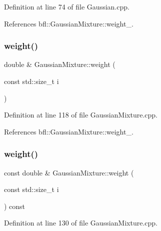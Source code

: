 Definition at line 74 of file Gaussian.\+cpp.



References bfl\+::\+Gaussian\+Mixture\+::weight\+\_\+.

\mbox{\label{classbfl_1_1GaussianMixture_a44885fb208e33f37015d47f55d02ef50}} 
\subsubsection{\texorpdfstring{weight()}{weight()}\hspace{0.1cm}{\footnotesize\ttfamily [3/4]}}
{\footnotesize\ttfamily double \& Gaussian\+Mixture\+::weight (\begin{DoxyParamCaption}\item[{const std\+::size\+\_\+t}]{i }\end{DoxyParamCaption})\hspace{0.3cm}{\ttfamily [inherited]}}



Definition at line 118 of file Gaussian\+Mixture.\+cpp.



References bfl\+::\+Gaussian\+Mixture\+::weight\+\_\+.

\mbox{\label{classbfl_1_1GaussianMixture_a42672f88d9126f018715a4d258a57731}} 
\subsubsection{\texorpdfstring{weight()}{weight()}\hspace{0.1cm}{\footnotesize\ttfamily [4/4]}}
{\footnotesize\ttfamily const double \& Gaussian\+Mixture\+::weight (\begin{DoxyParamCaption}\item[{const std\+::size\+\_\+t}]{i }\end{DoxyParamCaption}) const\hspace{0.3cm}{\ttfamily [inherited]}}



Definition at line 130 of file Gaussian\+Mixture.\+cpp.



